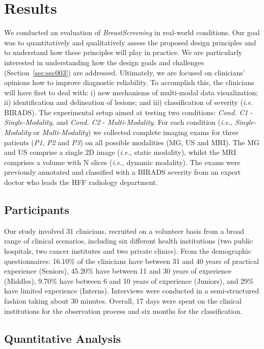 \section{Results}
\label{sec:sec005}

We conducted an evaluation of \textit{BreastScreening} in real-world conditions.
Our goal was to quantitatively and qualitatively assess the proposed design principles and to understand how these principles will play in practice.
We are particularly interested in understanding how
the design goals and challenges (Section~\ref{sec:sec003}) are addressed.
Ultimately, we are focused on clinicians' opinions how to improve diagnostic reliability.
To accomplish this, the clinicians will have first to deal with:
i) new mechanisms of multi-modal data visualization;
ii) identification and delineation of lesions; and
iii) classification of severity ({\em i.e.} BIRADS).
The experimental setup aimed at testing two conditions:
\textit{Cond. C1} - \textit{Single-Modality}, and
\textit{Cond. C2} - \textit{Multi-Modality}.
For each condition ({\it i.e.}, {\it Single-Modality} or {\it Multi-Modality}) we collected complete imaging exams for three patients (\textit{P1}, \textit{P2} and \textit{P3}) on all possible modalities (MG, US and MRI).
The MG and US comprise a single 2D image ({\em i.e.}, static modality), whilst the MRI comprises a volume with N slices ({\em i.e.}, dynamic modality).
The exams were previously annotated and classified with a BIRADS severity from an expert doctor who leads the HFF radiology department.

\subsection{Participants}

Our study involved 31 clinicians, recruited on a volunteer basis from a broad range of clinical scenarios, including six different health institutions (two public hospitals, two cancer institutes and two private clinics).
From the demographic questionnaires: 16.10\% of the clinicians have between 31 and 40 years of practical experience (Seniors), 45.20\% have between 11 and 30 years of experience (Middles), 9.70\% have between 6 and 10 years of experience (Juniors), and 29\% have limited experience (Interns).
Interviews were conducted in a semi-structured fashion taking about 30 minutes.
Overall, 17 days were spent on the clinical institutions for the observation process and six months for the classification.

\subsection{Quantitative Analysis}

